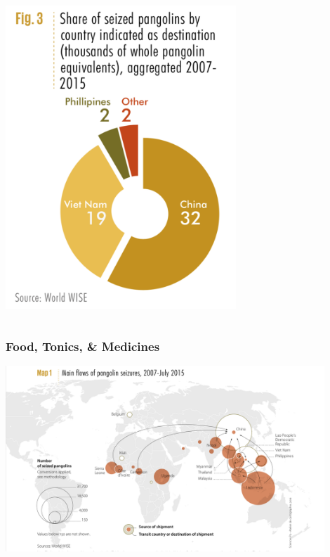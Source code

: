 \documentclass[10pt]{beamer}
\begin{document}
\begin{frame}
\begin{columns}
		\begin{column}{0.5\textwidth}
			\begin{center}
				\includegraphics[width=0.65\textwidth]{figures/pangolin_illegal_import.png}
			\end{center}
		\end{column}	
	\end{columns}
\end{frame}	


\begin{frame}[t]
\frametitle{Food, Tonics, \& Medicines}
\vspace{0.25cm}
	
	\begin{center}
		\includegraphics[width=0.9\textwidth]{figures/map5.png}
	\end{center}
\end{frame}	
\end{document}
